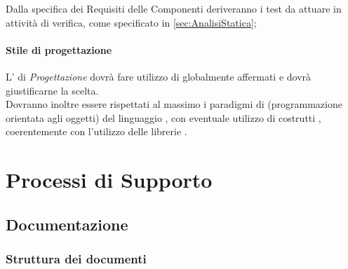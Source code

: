 \documentclass{scalatekids-article}
\begin{document}
Dalla specifica dei Requisiti delle Componenti deriveranno i test da attuare in
attività di verifica, come specificato in \ref{sec:AnalisiStatica};

\paragraph{Stile di progettazione}

L' di \textit{Progettazione} dovrà fare utilizzo di
 globalmente affermati e dovrà giustificarne la
scelta.\\Dovranno inoltre essere rispettati al massimo i paradigmi di  (programmazione orientata agli oggetti) del linguaggio , con eventuale utilizzo
di costrutti , coerentemente con l'utilizzo delle librerie
\textit{}.

\section{Processi di Supporto}

\subsection{Documentazione}

\subsubsection{Struttura dei documenti}
\end{document}
